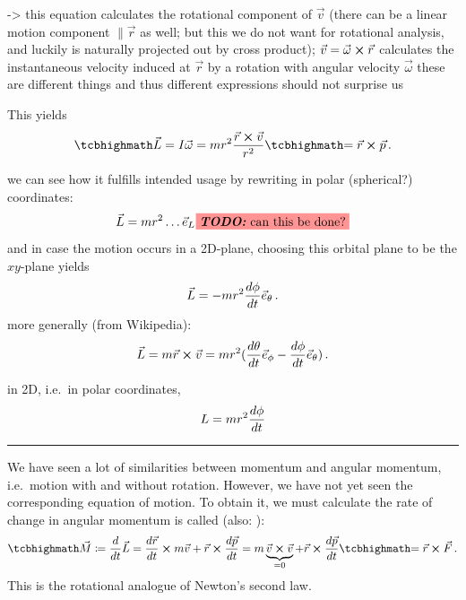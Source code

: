 \documentclass[../class_mech_main.tex]{subfiles}
\begin{document}
-> this equation calculates the rotational component of $\vec{v}$ (there can be a linear motion component $\parallel \vec{r}$ as well; but this we do not want for rotational analysis, and luckily is naturally projected out by cross product); $\vec{v} = \vec{\omega} \cross \vec{r}$ calculates the instantaneous velocity induced at $\vec{r}$ by a rotation with angular velocity $\vec{\omega}$ these are different things and thus different expressions should not surprise us

This yields
\begin{equation}\label{eq:angular_momentum_2}
    \eqbox{
		\vec{L}} = I \vec{\omega} = m r^2 \frac{\vec{r} \cross \vec{v}}{r^2} \eqbox{= \vec{r} \cross \vec{p}
	} \, .
\end{equation}



we can see how it fulfills intended usage by rewriting in polar (spherical?) coordinates:
\begin{equation}
    \vec{L} = m r^2 \dots \vec{e}_L \todo{can this be done?}
\end{equation}
and in case the motion occurs in a 2D-plane, choosing this orbital plane to be the $xy$-plane yields
\begin{equation}
    \vec{L} = - m r^2 \dv{\phi}{t} \vec{e}_\theta
	\, .
\end{equation}
more generally (from Wikipedia):
\begin{equation}
	\vec{L} = m \vec{r} \cross \vec{v} = m r^2 (\dv{\theta}{t} \vec{e}_\phi - \dv{\phi}{t} \vec{e}_\theta)
	\, .
\end{equation}

in 2D, i.e.~in polar coordinates,
\begin{equation}
	L = m r^2 \dv{\phi}{t}
\end{equation}


\hrule


We have seen a lot of similarities between momentum and angular momentum, i.e.~motion with and without rotation. However, we have not yet seen the corresponding equation of motion. To obtain it, we must calculate the rate of change in angular momentum is called  (also: ):
\begin{equation}
    \eqbox{\vec{M}} \coloneqq \dv{t} \vec{L} = \dv{\vec{r}}{t} \cross m \vec{v} + \vec{r} \cross \dv{\vec{p}}{t} = m \underbrace{\vec{v} \cross \vec{v}}_{= 0} + \vec{r} \cross \dv{\vec{p}}{t} \eqbox{= \vec{r} \cross \vec{F}} \, .
\end{equation}
This is the rotational analogue of Newton's second law.
\end{document}
